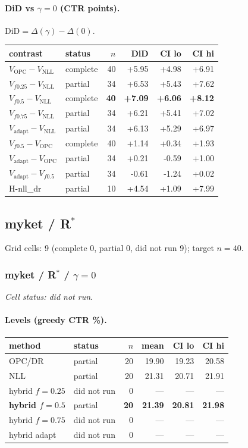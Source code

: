 \documentclass[10pt,a4paper]{article}
\begin{document}
\paragraph{DiD vs $\gamma=0$ (CTR points).} $\mathrm{DiD}=\Delta(\gamma)-\Delta(0)$.
{\centering\small\begin{tabular}{llrrrr}
\toprule contrast & status & $n$ & DiD & CI lo & CI hi \\
\midrule
$V_{\mathrm{OPC}}-V_{\mathrm{NLL}}$ & complete & 40 & +5.95 & +4.98 & +6.91 \\
$V_{f0.25}-V_{\mathrm{NLL}}$ & partial & 34 & +6.53 & +5.43 & +7.62 \\
\textbf{$V_{f0.5}-V_{\mathrm{NLL}}$} & complete & \textbf{40} & \textbf{+7.09} & \textbf{+6.06} & \textbf{+8.12} \\
$V_{f0.75}-V_{\mathrm{NLL}}$ & partial & 34 & +6.21 & +5.41 & +7.02 \\
$V_{\mathrm{adapt}}-V_{\mathrm{NLL}}$ & partial & 34 & +6.13 & +5.29 & +6.97 \\
$V_{f0.5}-V_{\mathrm{OPC}}$ & complete & 40 & +1.14 & +0.34 & +1.93 \\
$V_{\mathrm{adapt}}-V_{\mathrm{OPC}}$ & partial & 34 & +0.21 & -0.59 & +1.00 \\
$V_{\mathrm{adapt}}-V_{f0.5}$ & partial & 34 & -0.61 & -1.24 & +0.02 \\
H-nll\_dr & partial & 10 & +4.54 & +1.09 & +7.99 \\
\bottomrule\end{tabular}\par}
\bigskip
\newpage
\subsection{myket / R$^*$}
Grid cells: 9 (complete 0, partial 0, did not run 9); target $n=40$.
\subsubsection{myket / R$^*$ / $\gamma=0$}
\emph{Cell status: did not run}.
\paragraph{Levels (greedy CTR \%).}
{\centering\small\begin{tabular}{llrrrr}
\toprule method & status & $n$ & mean & CI lo & CI hi \\
\midrule
OPC/DR & partial & 20 & 19.90 & 19.23 & 20.58 \\
NLL & partial & 20 & 21.31 & 20.71 & 21.91 \\
hybrid $f{=}0.25$ & did not run & 0 & --- & --- & --- \\
\textbf{hybrid $f{=}0.5$} & partial & \textbf{20} & \textbf{21.39} & \textbf{20.81} & \textbf{21.98} \\
hybrid $f{=}0.75$ & did not run & 0 & --- & --- & --- \\
hybrid adapt & did not run & 0 & --- & --- & --- \\
\bottomrule\end{tabular}\par}
\end{document}
